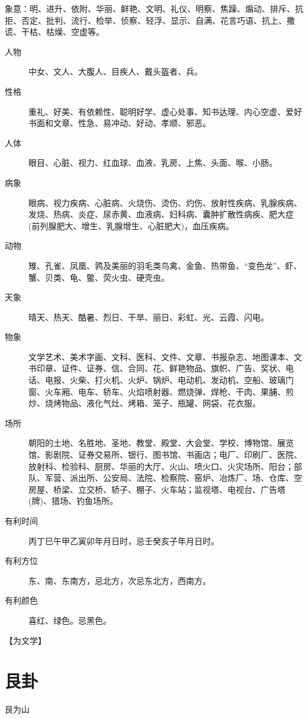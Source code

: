 \documentclass[12pt,oneside]{book}
\begin{document}
象意：明、进升、依附、华丽、鲜艳、文明、礼仪、明察、焦躁、煽动、排斥、抗拒、否定、批判、流行、检举、侦察、轻浮、显示、自满、花言巧语、抗上、撒谎、干枯、枯燥、空虚等。

\begin{description}
\item[人物] 中女、文人、大腹人、目疾人、戴头盔者、兵。
\item[性格] 重礼、好美、有依赖性、聪明好学、虚心处事、知书达理、内心空虚、爱好书面和文章、性急、易冲动、好动、孝顺、邪恶。
\item[人体] 眼目、心脏、视力、红血球、血液、乳房、上焦、头面、喉、小肠。
\item[病象] 眼病、视力疾病、心脏病、火烧伤、烫伤、灼伤、放射性疾病、乳腺疾病、发烧、热病、炎症、尿赤黄、血液病、妇科病、囊肿扩散性病疾、肥大症(前列腺肥大、增生、乳腺增生、心脏肥大)，血压疾病。
\item[动物] 雉、孔雀、凤凰、鹑及美丽的羽毛类鸟禽、金鱼、热带鱼、“变色龙”、虾、蟹、贝类、龟、鳖、荧火虫、硬壳虫。
\item[天象] 晴天、热天、酷暑、烈日、干旱、丽日、彩虹、光、云霞、闪电。
\item[物象] 文学艺术、美术字画、文科、医科、文件、文章、书报杂志、地图课本、文书印章、证件、证券、信、合同、花、鲜艳物品、旗帜、广告、奖状、电话、电报、火柴、打火机、火炉、锅炉、电动机、发动机、空船、玻璃门窗、火车厢、电车、轿车、火焰喷射器、燃烧弹、焊枪、干肉、果脯、煎炒、烧烤物品、液化气灶、烤箱、笼子、瓶罐、网袋、花衣服。
\item[场所] 朝阳的土地、名胜地、圣地、教堂、殿堂、大会堂、学校、博物馆、展览馆、影剧院、证券交易所、银行、图书馆、书画店；电厂、印刷厂、医院、放射科、检验科、厨房、华丽的大厅、火山、喷火口、火灾场所、阳台；部队、军营、派出所、公安局、法院、检察院、窑炉、冶炼厂、场、仓库、空房屋、桥梁、立交桥、轿子、棚子、火车站；监视塔、电视台、广告塔(牌)、猎场、钓鱼场所。
\item[有利时间] 丙丁巳午甲乙寅卯年月日时，忌壬癸亥子年月日时。
\item[有利方位] 东、南、东南方，忌北方，次忌东北方，西南方。
\item[有利颜色] 喜红、绿色。忌黑色。
\end{description}



【为文学】


\section{艮卦}
艮为山
\end{document}
